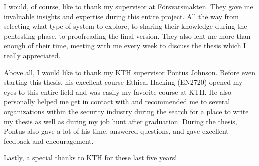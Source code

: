 I would, of course, like to thank my supervisor at Försvarsmakten. They gave me invaluable insights and expertise during this entire project. All the way from selecting what type of system to explore, to sharing their knowledge during the pentesting phase, to proofreading the final version. They also lent me more than enough of their time, meeting with me every week to discuss the thesis which I really appreciated.

Above all, I would like to thank my KTH supervisor Pontus Johnson. Before even starting this thesis, his excellent course Ethical Hacking (EN2720) opened my eyes to this entire field and was easily my favorite course at KTH. He also personally helped me get in contact with and recommended me to several organizations within the security industry during the search for a place to write my thesis as well as during my job hunt after graduation. During the thesis, Pontus also gave a lot of his time, answered questions, and gave excellent feedback and encouragement.

Lastly, a special thanks to KTH for these last five years!

\acknowlegmentssignature

\tableofcontents
\markboth{\contentsname}{}

\clearpage\listoffigures
\clearpage\listoftables
\clearpage\printglossary[type=\acronymtype, title={List of acronyms and abbreviations}]
